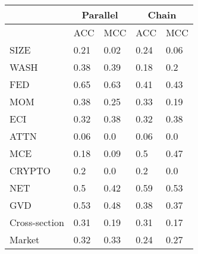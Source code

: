 \begin{tabularx}{\linewidth}{*{5}{X}}
\hline
& \multicolumn{2}{c}{Parallel} & \multicolumn{2}{c}{Chain}\\
\hline
& ACC & MCC& ACC & MCC\\
\hline
SIZE & 0.21 & 0.02 & 0.24 & 0.06\\
WASH & 0.38 & 0.39 & 0.18 & 0.2\\
FED & 0.65 & 0.63 & 0.41 & 0.43\\
MOM & 0.38 & 0.25 & 0.33 & 0.19\\
ECI & 0.32 & 0.38 & 0.32 & 0.38\\
ATTN & 0.06 & 0.0 & 0.06 & 0.0\\
MCE & 0.18 & 0.09 & 0.5 & 0.47\\
CRYPTO & 0.2 & 0.0 & 0.2 & 0.0\\
NET & 0.5 & 0.42 & 0.59 & 0.53\\
GVD & 0.53 & 0.48 & 0.38 & 0.37\\
Cross-section & 0.31 & 0.19 & 0.31 & 0.17\\
Market & 0.32 & 0.33 & 0.24 & 0.27\\
\hline
\end{tabularx}

